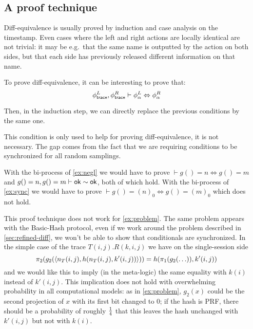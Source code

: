 \subsection{A proof technique}

Diff-equivalence is usually proved by induction and case analysis on
the timestamp. Even cases where the left and right actions are locally
identical are not trivial: it may be e.g.\ that the same name is outputted
by the action on both sides, but that each side has previously released
different information on that name.

To prove diff-equivalence, it can be interesting to prove that:
$$ \phi^L_{\textsf{trace}}, \phi^R_{\textsf{trace}} \vdash \phi^L_\alpha \Leftrightarrow \phi^R_\alpha $$

Then, in the induction step, we can directly replace the previous conditions by the same one.


This condition is only used to help for proving diff-equivalence, it is not necessary.
The gap comes from the fact that we are requiring conditions to be
synchronized for all random samplings.

\begin{example}
  With the bi-process of \cref{ex:negl} we would have to prove
  $\vdash g() = n \Leftrightarrow g() = m$ and
  $g()=n, g()=m \vdash \mathsf{ok} \sim \mathsf{ok}$, both of which hold.
  With the bi-process of \cref{ex:sync} we would have to prove
  $\vdash g() = (n)_0 \Leftrightarrow g() = (m)_0$ which does not hold.
\end{example}

\begin{example} \label{ex:indep}
  This proof technique does not work for \cref{ex:problem}.
  The same problem appears with the Basic-Hash protocol, even if we work around
the problem described in \cref{sec:refined-diff}, we won't be able to show
that conditionals are synchronized.  In the simple case of the trace
$T(i,j).R(k,i,j)$ we have
on the single-session side
$$\pi_2(g_2(\langle n_T(i,j),h(n_T(i,j),k'(i,j)) \rangle)) =
 h(\pi_1(g_2(\ldots)),k'(i,j))$$
and we would like this to imply (in the meta-logic)
the same equality with $k(i)$ instead of $k'(i,j)$.
This implication does not hold with overwhelming probability in all
computational models: as in \cref{ex:problem}, $g_2(x)$ could be the second
projection of $x$ with its first bit changed to $0$; if the hash is PRF,
there should be a probability of roughly $1 \over 4$ that this leaves
the hash unchanged with $k'(i,j)$ but not with $k(i)$.
\end{example}


